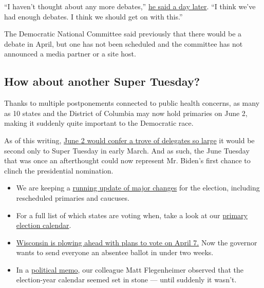 ``I haven't thought about any more debates,''
\href{https://www.nytimes3xbfgragh.onion/2020/03/25/us/politics/bernie-sanders-joe-biden-next-debate.html}{he
said a day later}. ``I think we've had enough debates. I think we should
get on with this.''

The Democratic National Committee said previously that there would be a
debate in April, but one has not been scheduled and the committee has
not announced a media partner or a site host.

\hypertarget{how-about-another-super-tuesday}{%
\subsection{How about another Super
Tuesday?}\label{how-about-another-super-tuesday}}

Thanks to multiple postponements connected to public health concerns, as
many as 10 states and the District of Columbia may now hold primaries on
June 2, making it suddenly quite important to the Democratic race.

As of this writing,
\href{https://www.nytimes3xbfgragh.onion/2020/03/25/us/politics/biden-sanders-coronavirus-june-2.html}{June
2 would confer a trove of delegates so large} it would be second only to
Super Tuesday in early March. And as such, the June Tuesday that was
once an afterthought could now represent Mr. Biden's first chance to
clinch the presidential nomination.

\begin{itemize}
\item
  We are keeping a
  \href{https://www.nytimes3xbfgragh.onion/article/2020-campaign-primary-calendar-coronavirus.html?action=click\&module=RelatedLinks\&pgtype=Article}{running
  update of major changes} for the election, including rescheduled
  primaries and caucuses.
\item
  For a full list of which states are voting when, take a look at our
  \href{https://www.nytimes3xbfgragh.onion/interactive/2019/us/elections/2020-presidential-election-calendar.html}{primary
  election calendar}.
\item
  \href{https://www.nytimes3xbfgragh.onion/2020/03/27/us/politics/wisconsin-primary-coronavirus.html}{Wisconsin
  is plowing ahead with plans to vote on April 7.} Now the governor
  wants to send everyone an absentee ballot in under two weeks.
\item
  In a
  \href{https://www.nytimes3xbfgragh.onion/2020/03/24/us/politics/coronavirus-2020-election-primary.html}{political
  memo}, our colleague Matt Flegenheimer observed that the election-year
  calendar seemed set in stone --- until suddenly it wasn't.
\end{itemize}

